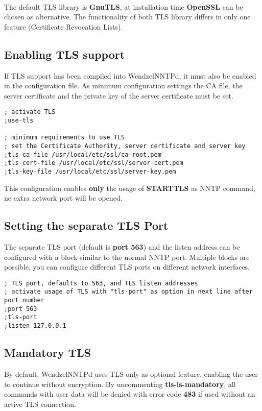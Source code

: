 ~

The default TLS library is \textbf{GnuTLS}, at installation time \textbf{OpenSSL} can be chosen as alternative. The functionality of both TLS library differs in only one feature (Certificate Revocation Lists).

\subsection{Enabling TLS support}

If TLS support has been compiled into WendzelNNTPd, it must also be enabled in the configuration file. As minimum configuration settings the CA file, the server certificate and the private key of the server certificate must be set.

\begin{verbatim}
; activate TLS
;use-tls

; minimum requirements to use TLS
; set the Certificate Authority, server certificate and server key
;tls-ca-file /usr/local/etc/ssl/ca-root.pem
;tls-cert-file /usr/local/etc/ssl/server-cert.pem
;tls-key-file /usr/local/etc/ssl/server-key.pem
\end{verbatim}

This configuration enables \textbf{only} the usage of \textbf{STARTTLS} as NNTP command, ne extra network port will be opened.

\subsection{Setting the separate TLS Port}

The separate TLS port (default is \textbf{port 563}) and the listen address can be configured with a block similar to the normal NNTP port. Multiple blocks are possible, you can configure different TLS ports on different network interfaces.

\begin{verbatim}
; TLS port, defaults to 563, and TLS listen addresses
; activate usage of TLS with "tls-port" as option in next line after port number
;port 563
;tls-port
;listen 127.0.0.1
\end{verbatim}

\subsection{Mandatory TLS}

By default, WendzelNNTPd uses TLS only as optional feature, enabling the user to continue without encryption. By uncommenting \textbf{tls-is-mandatory}, all commands with user data will be denied with error code \textbf{483} if used without an active TLS connection.

